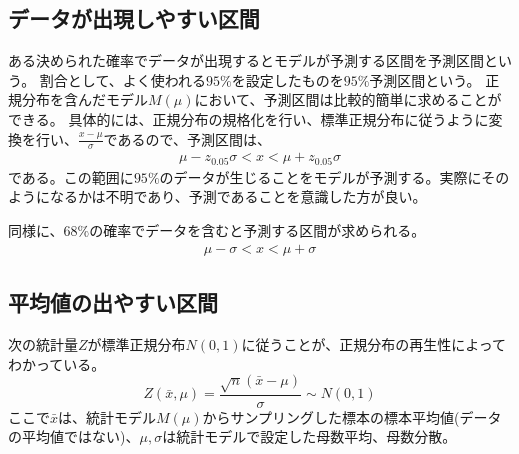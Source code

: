 \subsection{データが出現しやすい区間}
ある決められた確率でデータが出現するとモデルが予測する区間を予測区間という。
割合として、よく使われる$95\%$を設定したものを$95\%$予測区間という。
正規分布を含んだモデル$M(\mu)$において、予測区間は比較的簡単に求めることができる。
具体的には、正規分布の規格化を行い、標準正規分布に従うように変換を行い、$\frac{x-\mu}{\sigma}$であるので、予測区間は、
\begin{eqnarray*}
    \mu-z_{0.05}\sigma < x < \mu+z_{0.05}\sigma
\end{eqnarray*}
である。この範囲に$95\%$のデータが生じることをモデルが予測する。実際にそのようになるかは不明であり、予測であることを意識した方が良い。

同様に、$68\%$の確率でデータを含むと予測する区間が求められる。
\begin{eqnarray*}
    \mu-\sigma < x < \mu+\sigma
\end{eqnarray*}






\subsection{平均値の出やすい区間}
次の統計量$Z$が標準正規分布$N(0,1)$に従うことが、正規分布の再生性によってわかっている。
$$
Z(\bar{x},\mu)=\frac{\sqrt{n}(\bar{x}-\mu)}{\sigma} \sim N(0,1)
$$
ここで$\bar{x}$は、統計モデル$M(\mu)$からサンプリングした標本の標本平均値(データの平均値ではない)、$\mu,\sigma$は統計モデルで設定した母数平均、母数分散。


